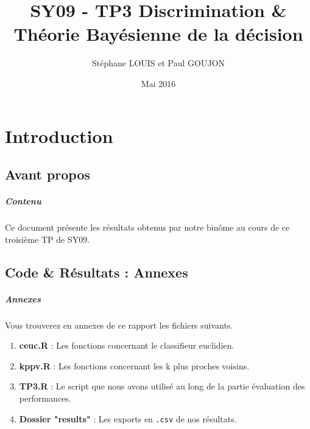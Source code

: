 \documentclass{report}
\begin{document}

\title{SY09 - TP3 Discrimination \& Théorie Bayésienne de la décision}
\date{Mai 2016}
\author{Stéphane LOUIS et Paul GOUJON}
\maketitle

\newpage
\tableofcontents{}

\newpage
{}
\chapter{Introduction}

\section{Avant propos}
\paragraph{Contenu}
Ce document présente les résultats obtenus par notre binôme au cours de ce troisième TP de SY09.

\section{Code \& Résultats : Annexes}
\paragraph{Annexes}
Vous trouverez en annexes de ce rapport les fichiers suivants.
\begin{enumerate}
    \item \textbf{ceuc.R} : Les fonctions concernant le classifieur euclidien.
    \item \textbf{kppv.R} : Les fonctions concernant les k plus proches voisins.
    \item \textbf{TP3.R} : Le script que nous avons utilisé au long de la partie évaluation des performances.
    \item \textbf{Dossier "results"} : Les exports en \verb+.csv+ de nos résultats.
\end{enumerate}
\end{document}
